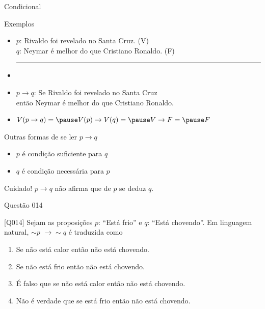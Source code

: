 \documentclass[xcolor=dvipsnames,table]{beamer}
\begin{document}
\begin{frame}{Condicional}
	\begin{block}{Exemplos}
		\begin{itemize}
			\item $p$: Rivaldo foi revelado no Santa Cruz. \hspace*{0.9cm} (V)\\
			$q$: Neymar é melhor do que Cristiano Ronaldo. \hspace*{0.9cm} (F)\\
			\hrule
			\item \pause
			\item $p \rightarrow q$: Se Rivaldo foi revelado no Santa Cruz \\
			\hspace*{1.1cm} então Neymar é melhor do que Cristiano Ronaldo.\\ \pause
			\vspace*{0.3cm}
			\item $V(p \rightarrow q) = \pause V(p) \rightarrow V(q) = \pause V \rightarrow F = \pause F$
		\end{itemize}
	\end{block} \pause
	\begin{exampleblock}{Outras formas de se ler $p \rightarrow q$}
		\begin{itemize}[label=-]
			\item $p$ é condição suficiente para $q$
			\item $q$ é condição necessária para $p$
		\end{itemize}
	\end{exampleblock} \pause
	\begin{alertblock}{Cuidado!}
		$p \rightarrow q$ não afirma que de $p$ se deduz $q$.
	\end{alertblock}
\end{frame}

\begin{frame}{Questão 014}
\begin{block}{[Q014]}
	Sejam as proposições $p$: ``Está frio'' e $q$: ``Está chovendo''. Em linguagem natural, $\sim p$ $\rightarrow \sim q$ é traduzida como 
\end{block}
\begin{enumerate}[label=(\Alph*)]
	\item Se não está calor então não está chovendo.
	\item Se não está frio então não está chovendo.
	\item É falso que se não está calor então não está chovendo.
	\item Não é verdade que se está frio então não está chovendo.
\end{enumerate}
\end{frame}
\end{document}
